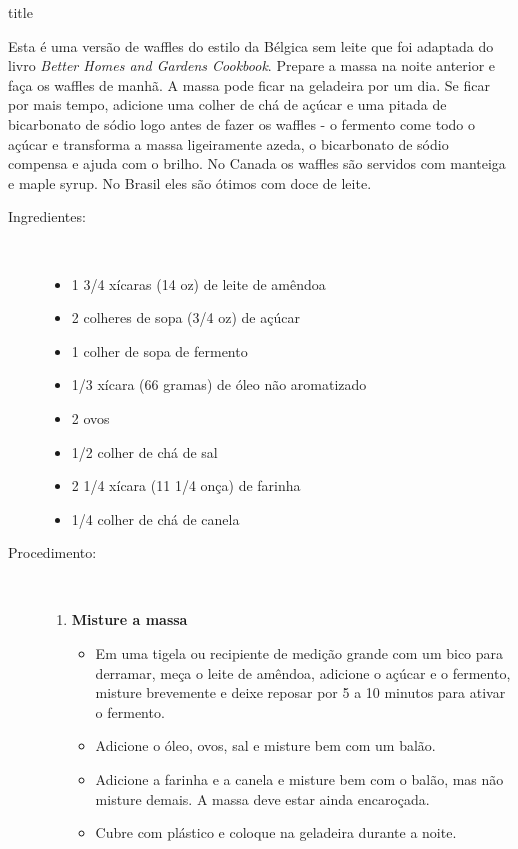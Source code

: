 \documentclass [11pt, letterpaper] {article}
\begin{document}
 {title}


Esta é uma versão de waffles do estilo da B\'elgica sem leite que foi adaptada do livro {\it Better Homes and Gardens Cookbook}. Prepare a massa na noite anterior e fa\c{c}a os waffles de manhã. A massa pode ficar na geladeira por um dia. Se ficar por mais tempo, adicione uma colher de chá de açúcar e uma pitada de bicarbonato de sódio logo antes de fazer os waffles - o fermento come todo o açúcar e transforma a massa ligeiramente azeda, o bicarbonato de sódio compensa e ajuda com o brilho. No Canada os waffles s\~ao servidos com manteiga e maple syrup. No Brasil eles s\~ao \'otimos com doce de leite.

\begin {description}

\item [Ingredientes:] \ \\
\begin {itemize}
\item 1 3/4 xícaras (14 oz) de leite de amêndoa
\item 2 colheres de sopa (3/4 oz) de açúcar
\item 1 colher de sopa de fermento
\item 1/3 xícara (66 gramas) de óleo não aromatizado
\item 2 ovos
\item 1/2 colher de chá de sal
\item 2 1/4 xícara (11 1/4 onça) de farinha
\item 1/4 colher de chá de canela
\end {itemize}

\item [Procedimento:] \ \\

\begin {enumerate}
\item {\bf Misture a massa}
\begin {itemize}
\item Em uma tigela ou recipiente de medição grande com um bico para derramar, me\c{c}a o leite de amêndoa, adicione o açúcar e o fermento, misture brevemente e deixe reposar por 5 a 10 minutos para ativar o fermento.
\item Adicione o óleo, ovos, sal e misture bem com um bal\~ao.
\item Adicione a farinha e a canela e misture bem com o bal\~ao, mas não misture demais. A massa deve estar ainda encaro\c{c}ada.
\item Cubre com plástico e coloque na geladeira durante a noite.
\end {itemize}


\end{enumerate}
\end{description}
\end{document}
